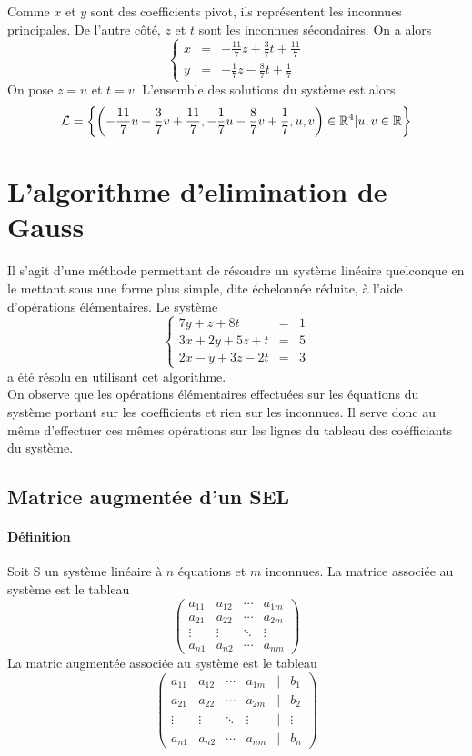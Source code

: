Comme $x$ et $y$ sont des coefficients pivot, ils représentent les inconnues principales. De l'autre côté, $z$ et $t$ sont les inconnues sécondaires. On a alors
$$\left\{ \begin{array}{rcl}
  x & = & -\frac{11}{7} z + \frac{3}{7} t + \frac{11}{7} \\
  y & = & -\frac{1}{7} z - \frac{8}{7} t + \frac{1}{7}
\end{array} \right.$$
On pose $z=u$ et $t=v$. L'ensemble des solutions du système est alors
$$\mathcal{L} = \left\{ \left(-\frac{11}{7} u + \frac{3}{7} v + \frac{11}{7}, -\frac{1}{7} u - \frac{8}{7} v + \frac{1}{7}, u, v \right) \in \mathbb{R}^4 \vert u, v \in \mathbb{R} \right\}$$
%
%
\section{L'algorithme d'elimination de Gauss}
%
%
Il s'agit d'une méthode permettant de résoudre un système linéaire quelconque en le mettant sous une forme plus simple, dite échelonnée réduite, à l'aide d'opérations élémentaires. Le système
$$\left\{\begin{array}{rcl}
  7 y + z + 8 t & = & 1 \\
  3 x + 2 y + 5 z + t & = & 5 \\
  2 x - y + 3 z - 2 t & = & 3
\end{array} \right.$$
a été résolu en utilisant cet algorithme. \\
On observe que les opérations élémentaires effectuées sur les équations du système portant sur les coefficients et rien sur les inconnues. Il serve donc au même d'effectuer ces mêmes opérations sur les lignes du tableau des coéfficiants du système.

%
\subsection{Matrice augmentée d'un SEL}
%
\paragraph{Définition} Soit S un système linéaire à $n$ équations et $m$ inconnues. La matrice associée au système est le tableau
$$\begin{pmatrix}
  a_{11} & a_{12} & \cdots & a_{1m} \\
  a_{21} & a_{22} & \cdots & a_{2m} \\
  \vdots  & \vdots  & \ddots & \vdots  \\
  a_{n1} & a_{n2} & \cdots & a_{nm}
 \end{pmatrix}$$
La matric augmentée associée au système est le tableau
$$\begin{pmatrix}
  a_{11} & a_{12} & \cdots & a_{1m} & \vert & b_{1} \\
  a_{21} & a_{22} & \cdots & a_{2m} & \vert & b_{2} \\
  \vdots  & \vdots  & \ddots & \vdots& \vert & \vdots  \\
  a_{n1} & a_{n2} & \cdots & a_{nm} & \vert & b_{n}
 \end{pmatrix}$$
 
